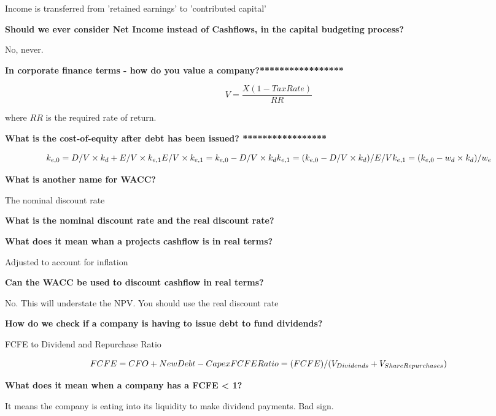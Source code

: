 \documentclass[12pt]{article}
\begin{document}
	Income is transferred from 'retained earnings' to 'contributed capital'
	
	\textbf{Should we ever consider Net Income instead of Cashflows, in the capital budgeting process?}
	
	No, never.
	
	\textbf{In corporate finance terms - how do you value a company?*****************}
	
	$$
	V = \dfrac{ X (1 - TaxRate)}{RR}
	$$
	
	where $RR$ is the required rate of return.
	
	\textbf{What is the cost-of-equity after debt has been issued? *****************}
	
	$$
	k_{e,0} = D/V \times k_d + E/V \times k_{e,1}  \\
	E/V \times k_{e,1}  = k_{e,0}  - D/V \times k_d  \\
	k_{e,1}  = (k_{e,0}   - D/V \times k_d) / E/V   \\
	k_{e,1}  = (k_{e,0}   - w_d \times k_d) / w_e  \\
	$$
	\begin{framed}
	\textbf{What is another name for WACC?}
	
	The nominal discount rate
	
	\textbf{What is the nominal discount rate and the real discount rate?}
	
	
	
	\textbf{What does it mean whan a projects cashflow is in real terms?}
	
	Adjusted to account for inflation
	
	\textbf{Can the WACC be used to discount cashflow in real terms?}
	
	No. This will understate the NPV. You should use the real discount rate
	
	\end{framed}

	\textbf{How do we check if a company is having to issue debt to fund dividends?}
	
	FCFE to Dividend and Repurchase Ratio
	
	
	$$
	FCFE = CFO + New Debt - Capex \\
	FCFE Ratio = (FCFE) / (V_{Dividends} + V_{Share Repurchases})
	$$
	
	\textbf{What does it mean when a company has a FCFE < 1?}

	It means the  company is eating into its liquidity to make dividend payments. Bad sign.
	
\end{document}
